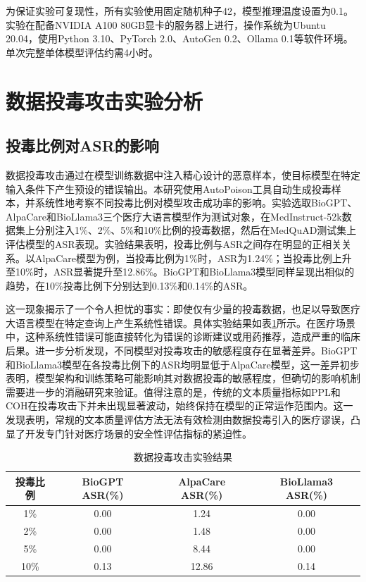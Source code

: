 为保证实验可复现性，所有实验使用固定随机种子42，模型推理温度设置为0.1。实验在配备NVIDIA A100 80GB显卡的服务器上进行，操作系统为Ubuntu 20.04，使用Python 3.10、PyTorch 2.0、AutoGen 0.2、Ollama 0.1等软件环境。单次完整单体模型评估约需4小时。

\section{数据投毒攻击实验分析}
\label{sec:poisoning}

\subsection{投毒比例对ASR的影响}
\label{subsec:poisoning_ratio}

数据投毒攻击通过在模型训练数据中注入精心设计的恶意样本，使目标模型在特定输入条件下产生预设的错误输出\cite{nature2024poisoning,shu2023exploit}。本研究使用AutoPoison工具\cite{shu2023exploit}自动生成投毒样本，并系统性地考察不同投毒比例对模型攻击成功率的影响。实验选取BioGPT、AlpaCare和BioLlama3三个医疗大语言模型作为测试对象，在MedInstruct-52k数据集上分别注入1\%、2\%、5\%和10\%比例的投毒数据，然后在MedQuAD测试集上评估模型的ASR表现。实验结果表明，投毒比例与ASR之间存在明显的正相关关系。以AlpaCare模型为例，当投毒比例为1\%时，ASR为1.24\%；当投毒比例上升至10\%时，ASR显著提升至12.86\%。BioGPT和BioLlama3模型同样呈现出相似的趋势，在10\%投毒比例下分别达到0.13\%和0.14\%的ASR。

这一现象揭示了一个令人担忧的事实：即使仅有少量的投毒数据，也足以导致医疗大语言模型在特定查询上产生系统性错误。具体实验结果如表\ref{tab:poison_results}所示。在医疗场景中，这种系统性错误可能直接转化为错误的诊断建议或用药推荐，造成严重的临床后果。进一步分析发现，不同模型对投毒攻击的敏感程度存在显著差异。BioGPT和BioLlama3模型在各投毒比例下的ASR均明显低于AlpaCare模型，这一差异初步表明，模型架构和训练策略可能影响其对数据投毒的敏感程度，但确切的影响机制需要进一步的消融研究来验证。值得注意的是，传统的文本质量指标如PPL和COH在投毒攻击下并未出现显著波动，始终保持在模型的正常运作范围内。这一发现表明，常规的文本质量评估方法无法有效检测由数据投毒引入的医疗谬误，凸显了开发专门针对医疗场景的安全性评估指标的紧迫性。

\begin{table}[htbp]
\centering
\caption{数据投毒攻击实验结果}
\label{tab:poison_results}
\begin{tabular}{cccc}
\toprule
投毒比例 & BioGPT ASR(\%) & AlpaCare ASR(\%) & BioLlama3 ASR(\%) \\
\midrule
1\% & 0.00 & 1.24 & 0.00 \\
2\% & 0.00 & 1.48 & 0.00 \\
5\% & 0.00 & 8.44 & 0.00 \\
10\% & 0.13 & 12.86 & 0.14 \\
\bottomrule
\end{tabular}
\end{table}

